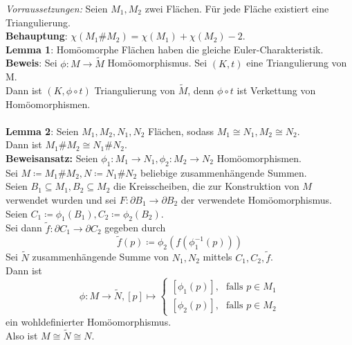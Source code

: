 \begin{problem*}[2]
  \emph{Vorraussetzungen:} Seien \( M_1, M_2 \) zwei Flächen. Für jede Fläche existiert eine Triangulierung. \\
  \textbf{Behauptung}: \( \chi(M_1 \# M_2) = \chi(M_1) + \chi(M_2) - 2 \). \\
  \textbf{Lemma 1}: Homöomorphe Flächen haben die gleiche Euler-Charakteristik. \\
  \textbf{Beweis}: Sei \( \phi : M \to \tilde{M} \) Homöomorphismus. Sei \( (K,t) \) eine Triangulierung von M. \\
  Dann ist \( (K,\phi \circ t) \) Triangulierung von \( \tilde{M} \), denn \( \phi \circ t \) ist Verkettung von Homöomorphismen. \\
  \  \\
  \textbf{Lemma 2}: Seien \( M_1, M_2, N_1, N_2 \) Flächen, sodass \( M_1 \cong N_1, M_2 \cong N_2 \). \\
  Dann ist \( M_1 \# M_2 \cong N_1 \# N_2 \). \\
  \textbf{Beweisansatz:} Seien \( \phi_1: M_1 \to N_1, \phi_2: M_2 \to N_2 \) Homöomorphismen. \\
  Sei \( M \coloneqq M_1 \# M_2 , N \coloneqq N_1 \# N_2 \) beliebige zusammenhängende Summen. \\
  Seien \( B_1 \subseteq M_1, B_2 \subseteq M_2 \) die Kreisscheiben, die zur Konstruktion von \( M \) verwendet wurden und sei \( F: \partial B_1 \to \partial B_2 \) der verwendete Homöomorphismus. \\
  Seien \( C_1 \coloneqq \phi_1 (B_1), C_2 \coloneqq \phi_2 (B_2) \). \\
  Sei dann \( \tilde{f} : \partial C_1 \to \partial C_2 \) gegeben durch 
  \begin{equation*}
    \tilde{f}(p) \coloneqq \phi_2 (f(\phi_1^{-1}(p)))
  \end{equation*}
  Sei \( \tilde{N} \) zusammenhängende Summe von \( N_1, N_2 \) mittels \( C_1, C_2, \tilde{f} \). \\
  Dann ist
  \begin{equation*}
    \phi: M \to \tilde{N}, [p] \mapsto \begin{cases}
      [\phi_1(p)]\text{,} &\text{falls } p \in M_1 \\
      [\phi_2(p)]\text{,} &\text{falls } p \in M_2
    \end{cases}
  \end{equation*}
  ein wohldefinierter Homöomorphismus. \\
  Also ist \( M \cong \tilde{N} \cong N \). \\
  

\end{problem*}
